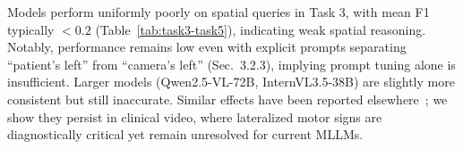 \documentclass{article}
\theoremstyle{plain}
\theoremstyle{definition}
\theoremstyle{remark}
\begin{document}


Models perform uniformly poorly on spatial queries in Task 3, with mean F1 typically $<0.2$ (Table~\ref{tab:task3-task5}), indicating weak spatial reasoning. Notably, performance remains low even with explicit prompts separating “patient’s left” from “camera’s left” (Sec.~3.2.3), implying prompt tuning alone is insufficient. Larger models (Qwen2.5-VL-72B, InternVL3.5-38B) are slightly more consistent but still inaccurate. Similar effects have been reported elsewhere~\cite{Hoehing2023LeftRight}; we show they persist in clinical video, where lateralized motor signs are diagnostically critical yet remain unresolved for current MLLMs.
\end{document}
